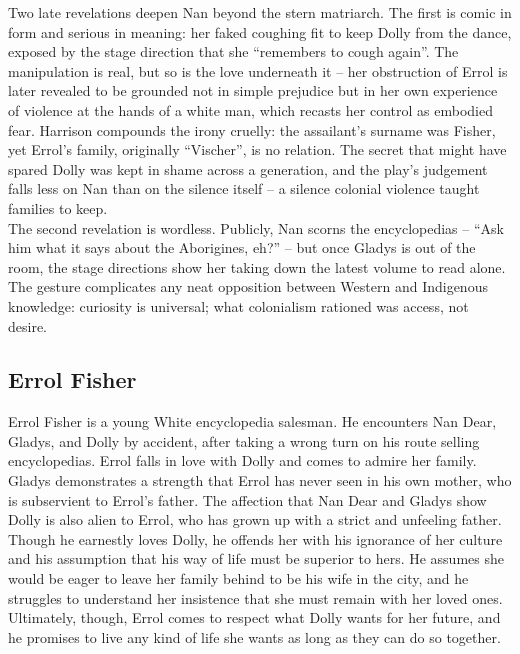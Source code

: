 \documentclass[a4paper]{article}
\begin{document}
Two late revelations deepen Nan beyond the stern matriarch. The first is comic in form and serious in meaning: her faked coughing fit to keep Dolly from the dance, exposed by the stage direction that she ``remembers to cough again''. The manipulation is real, but so is the love underneath it -- her obstruction of Errol is later revealed to be grounded not in simple prejudice but in her own experience of violence at the hands of a white man, which recasts her control as embodied fear. Harrison compounds the irony cruelly: the assailant's surname was Fisher, yet Errol's family, originally ``Vischer'', is no relation. The secret that might have spared Dolly was kept in shame across a generation, and the play's judgement falls less on Nan than on the silence itself -- a silence colonial violence taught families to keep.\\

The second revelation is wordless. Publicly, Nan scorns the encyclopedias -- ``Ask him what it says about the Aborigines, eh?'' -- but once Gladys is out of the room, the stage directions show her taking down the latest volume to read alone. The gesture complicates any neat opposition between Western and Indigenous knowledge: curiosity is universal; what colonialism rationed was access, not desire.\\


\subsection{Errol Fisher}
Errol Fisher is a young White encyclopedia
salesman. He encounters Nan Dear, Gladys, and Dolly by
accident, after taking a wrong turn on his route selling
encyclopedias. Errol falls in love with Dolly and comes to
admire her family. Gladys demonstrates a strength that Errol
has never seen in his own mother, who is subservient to Errol’s father. The affection that Nan Dear and Gladys show Dolly is
also alien to Errol, who has grown up with a strict and unfeeling
father. Though he earnestly loves Dolly, he offends her with his
ignorance of her culture and his assumption that his way of life
must be superior to hers. He assumes she would be eager to
leave her family behind to be his wife in the city, and he
struggles to understand her insistence that she must remain
with her loved ones. Ultimately, though, Errol comes to respect
what Dolly wants for her future, and he promises to live any
kind of life she wants as long as they can do so together.\\
\end{document}
